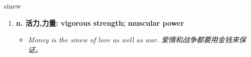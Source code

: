 
\begin{frame}
{\huge sinew}
\begin{center}
\begin{enumerate}\Large
  \item \textbf{n. 活力,力量: vigorous strength; muscular power}
  \begin{itemize}
    \item \em{\Large{Money is the sinew of love as well as war. 爱情和战争都要用金钱来保证。}}
  \end{itemize}
\end{enumerate}
\end{center}
\end{frame}
